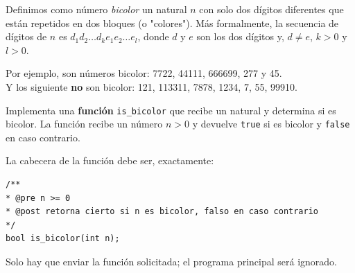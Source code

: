 
\Statement

Definimos como número \emph{bicolor} un natural $n$ con solo dos dígitos diferentes que están repetidos en dos bloques (o "colores"). Más formalmente, la secuencia de dígitos de $n$ es $d_1d_2\ldots d_ke_1e_2\ldots e_l$, donde $d$ y $e$ son los dos dígitos y, $d\neq e$, $k > 0$ y $l > 0$.

\medskip

Por ejemplo, son números bicolor: 7722, 44111, 666699, 277 y 45. \\
Y los siguiente \textbf{no} son bicolor: 121, 113311, 7878, 1234, 7, 55, 99910.

\medskip

Implementa una \textbf{función} \verb|is_bicolor| que recibe un natural y determina si es bicolor. La función recibe un número $n > 0$ y devuelve \texttt{true} si es bicolor y \texttt{false} en caso contrario.

\medskip

La cabecera de la función debe ser, exactamente:

\begin{verbatim}
/**
* @pre n >= 0
* @post retorna cierto si n es bicolor, falso en caso contrario
*/
bool is_bicolor(int n);
\end{verbatim}

\Observation

Solo hay que enviar la función solicitada; el programa principal será ignorado.


